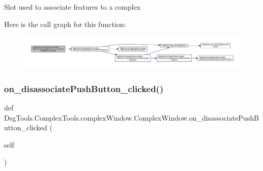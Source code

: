 \begin{DoxyVerb}Slot used to associate features to a complex
\end{DoxyVerb}
 Here is the call graph for this function\+:
\nopagebreak
\begin{figure}[H]
\begin{center}
\leavevmode
\includegraphics[width=350pt]{class_dsg_tools_1_1_complex_tools_1_1complex_window_1_1_complex_window_a38d766c9c5d37678bcbf0018f2d13a1c_cgraph}
\end{center}
\end{figure}
\mbox{\label{class_dsg_tools_1_1_complex_tools_1_1complex_window_1_1_complex_window_ad92dd4f252e46de62faa10df84639819}} 
\subsubsection{\texorpdfstring{on\+\_\+disassociate\+Push\+Button\+\_\+clicked()}{on\_disassociatePushButton\_clicked()}}
{\footnotesize\ttfamily def Dsg\+Tools.\+Complex\+Tools.\+complex\+Window.\+Complex\+Window.\+on\+\_\+disassociate\+Push\+Button\+\_\+clicked (\begin{DoxyParamCaption}\item[{}]{self }\end{DoxyParamCaption})}

